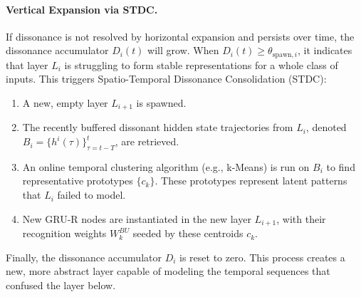 \documentclass{article}
\numberwithin{figure}{section}
\numberwithin{table}{section}
\numberwithin{algorithm}{section}
\begin{document}
\paragraph{Vertical Expansion via STDC.} If dissonance is not resolved by horizontal expansion and persists over time, the dissonance accumulator $D_i(t)$ will grow. When $D_i(t) \ge \theta_{\text{spawn},i}$, it indicates that layer $L_i$ is struggling to form stable representations for a whole class of inputs. This triggers Spatio-Temporal Dissonance Consolidation (STDC):
\begin{enumerate}
    \item A new, empty layer $L_{i+1}$ is spawned.
    \item The recently buffered dissonant hidden state trajectories from $L_i$, denoted $B_i = \{h^i(\tau)\}_{\tau=t-T}^{t}$, are retrieved.
    \item An online temporal clustering algorithm (e.g., k-Means) is run on $B_i$ to find representative prototypes $\{c_k\}$. These prototypes represent latent patterns that $L_i$ failed to model.
    \item New GRU-R nodes are instantiated in the new layer $L_{i+1}$, with their recognition weights $W_k^{BU}$ seeded by these centroids $c_k$.
\end{enumerate}
Finally, the dissonance accumulator $D_i$ is reset to zero. This process creates a new, more abstract layer capable of modeling the temporal sequences that confused the layer below.
\end{document}
